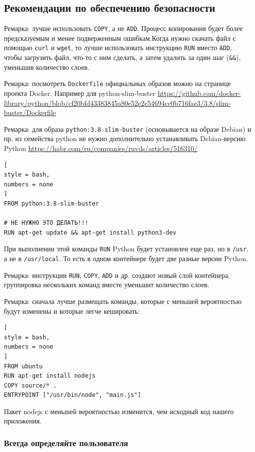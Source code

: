 \documentclass[%
	11pt,
	a4paper,
	utf8,
		]{article}
\begin{document}
\subsection{Рекомендации по обеспечению безопасности}

Ремарка: лучше использовать \verb|COPY|, а не \verb|ADD|. Процесс копирования будет более предсказуемым и менее подверженным ошибкам.Когда нужно скачать файл с помощью \verb|curl| и \verb|wget|, то лучше использовать инструкцию \verb|RUN| вместо \verb|ADD|, чтобы загрузить файл, что-то с ним сделать, а затем удалить за один шаг (\verb|&&|), уменьшив количество слоев.

Ремарка: посмотреть \verb|Dockerfile| официальных образов можно на странице проекта Docker. Например для python-slim-buster \url{https://github.com/docker-library/python/blob/cf20bfd43383845a80e52e2c54694cc0b716fae3/3.8/slim-buster/Dockerfile}

Ремарка: для образа \verb|python:3.8-slim-buster| (основывается на образе Debian) и пр. из семейства python не нужно дополнительно устанавливать Debian-версию Python \url{https://habr.com/ru/companies/ruvds/articles/516310/}
\begin{lstlisting}[
style = bash,
numbers = none
]
FROM python:3.8-slim-buster

# НЕ НУЖНО ЭТО ДЕЛАТЬ!!!
RUN apt-get update && apt-get install python3-dev
\end{lstlisting}

При выполнении этой команды \verb|RUN| Python будет установлен еще раз, но в \verb|/usr|, а не в \verb|/usr/local|. То есть в одном контейнере будет две разные версии Python.

Ремарка: инструкции \verb|RUN|, \verb|COPY|, \verb|ADD| и др. создают новый слой контейнера, группировка нескольких команд вместе уменьшит количество слоев.

Ремарка: сначала лучше размещать команды, которые с меньшей вероятностью будут изменены и которые легче кешировать:
\begin{lstlisting}[
style = bash,
numbers = none
]
FROM ubuntu
RUN apt-get install nodejs
COPY source/* .
ENTRYPOINT ["/usr/bin/node", "main.js"]
\end{lstlisting}

Пакет nodejs с меньшей вероятностью изменится, чем исходный код нашего приложения.

\subsubsection{Всегда определяйте пользователя}
\end{document}
